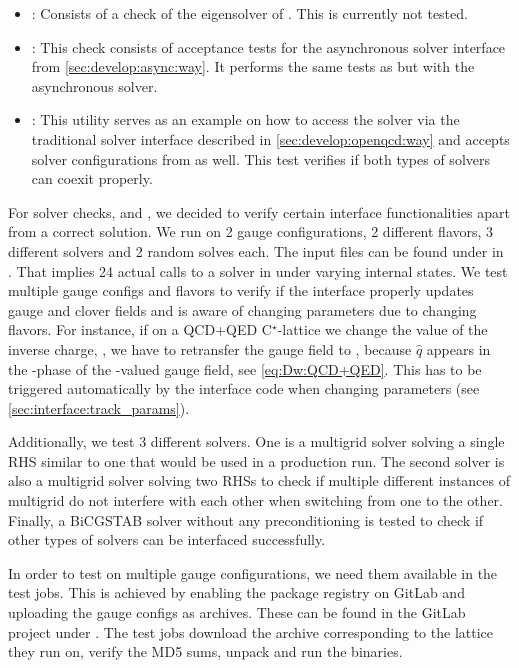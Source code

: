\begin{itemize}
  \item {}: Consists of a check of the eigensolver of \quda. This is currently not tested.
  \item {}: This check consists of acceptance tests for the asynchronous solver interface from \cref{sec:develop:async:way}. It performs the same tests as  but with the asynchronous solver.
  \item {}: This utility serves as an example on how to access the \quda solver via the traditional solver interface described in \cref{sec:develop:openqcd:way} and accepts solver configurations from \openqxd as well. This test verifies if both types of solvers can coexit properly.
\end{itemize}

For solver checks,  and , we decided to verify certain interface functionalities apart from a correct solution.
We run on \num{2} gauge configurations, \num{2} different flavors, \num{3} different solvers and \num{2} random solves each.
The input files can be found under  in \cite{gitlab:openqxd-devel}.
That implies \num{24} actual calls to a solver in \quda under varying internal states.
We test multiple gauge configs and flavors to verify if the interface properly updates gauge and clover fields and is aware of changing parameters due to changing flavors.
For instance, if on a QCD+QED C$^{\star}$-lattice we change the value of the inverse charge, , we have to retransfer the gauge field to \quda, because $\hat{q}$ appears in the -phase of the -valued gauge field, see \cref{eq:Dw:QCD+QED}.
This has to be triggered automatically by the interface code when changing parameters (see \cref{sec:interface:track_params}).

Additionally, we test \num{3} different solvers.
One is a multigrid solver solving a single RHS similar to one that would be used in a production run.
The second solver is also a multigrid solver solving two RHSs to check if multiple different instances of multigrid do not interfere with each other when switching from one to the other.
Finally, a BiCGSTAB solver without any preconditioning is tested to check if other types of solvers can be interfaced successfully.

In order to test on multiple gauge configurations, we need them available in the test jobs.
This is achieved by enabling the package registry on GitLab and uploading the gauge configs as  archives.
These can be found in the GitLab project under .
The test jobs download the archive corresponding to the lattice they run on, verify the MD5 sums, unpack and run the binaries.

